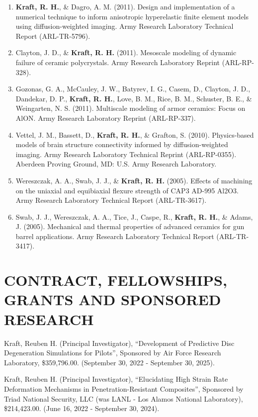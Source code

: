 \documentclass[a4paper,10pt]{article}
\begin{document}
\begin{enumerate}
  \item \textbf{\textbf{Kraft,} R. H.}, \&
 Dagro, A. M. (2011). Design and implementation of a numerical technique to inform anisotropic hyperelastic finite element models using diffusion-weighted imaging. Army Research Laboratory Technical Report (ARL-TR-5796).
  \item Clayton, J. D., \&
 \textbf{\textbf{Kraft,} R. H.} (2011). Mesoscale modeling of dynamic failure of ceramic polycrystals. Army Research Laboratory Reprint (ARL-RP-328).
  \item Gozonas, G. A., McCauley, J. W., Batyrev, I. G., Casem, D., Clayton, J. D., Dandekar, D. P., \textbf{\textbf{Kraft,} R. H.}, Love, B. M., Rice, B. M., Schuster, B. E., \&
 Weingarten, N. S. (2011). Multiscale modeling of armor ceramics: Focus on AlON. Army Research Laboratory Reprint (ARL-RP-337).
  \item Vettel, J. M., Bassett, D., \textbf{\textbf{Kraft,} R. H.}, \&
 Grafton, S. (2010). Physics-based models of brain structure connectivity informed by diffusion-weighted imaging. Army Research Laboratory Technical Reprint (ARL-RP-0355). Aberdeen Proving Ground, MD: U.S. Army Research Laboratory.
  \item Wereszczak, A. A., Swab, J. J., \&
 \textbf{\textbf{Kraft,} R. H.} (2005). Effects of machining on the uniaxial and equibiaxial flexure strength of CAP3 AD-995 Al2O3. Army Research Laboratory Technical Report (ARL-TR-3617).
  \item Swab, J. J., Wereszczak, A. A., Tice, J., Caspe, R., \textbf{\textbf{Kraft,} R. H.}, \&
 Adams, J. (2005). Mechanical and thermal properties of advanced ceramics for gun barrel applications. Army Research Laboratory Technical Report (ARL-TR-3417).

    \end{enumerate}
    

    \section*{CONTRACT, FELLOWSHIPS, GRANTS AND SPONSORED RESEARCH}
    
        \noindent Kraft, Reuben H. (Principal Investigator), ``Development of Predictive Disc Degeneration Simulations for Pilots'', Sponsored by Air Force Research Laboratory, \$359,796.00. (September 30, 2022 - September 30, 2025).\vspace{0.25cm}
        
        \noindent Kraft, Reuben H. (Principal Investigator), ``Elucidating High Strain Rate Deformation Mechanisms in Penetration-Resistant Composites'', Sponsored by Triad National Security, LLC (was LANL - Los Alamos National Laboratory), \$214,423.00. (June 16, 2022 - September 30, 2024).\vspace{0.25cm}
        
\end{document}
